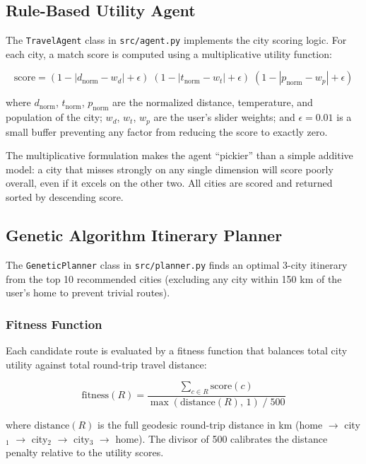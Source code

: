 \documentclass[12pt]{article}
\begin{document}
\subsection{Rule-Based Utility Agent}
The \texttt{TravelAgent} class in \texttt{src/agent.py} implements the city scoring logic. For each city, a match score is computed using a multiplicative utility function:

\begin{equation}
    \text{score} = (1 - |d_{\text{norm}} - w_d| + \epsilon)\;
                   (1 - |t_{\text{norm}} - w_t| + \epsilon)\;
                   (1 - |p_{\text{norm}} - w_p| + \epsilon)
\end{equation}

where $d_{\text{norm}}$, $t_{\text{norm}}$, $p_{\text{norm}}$ are the normalized distance, temperature, and population of the city; $w_d$, $w_t$, $w_p$ are the user's slider weights; and $\epsilon = 0.01$ is a small buffer preventing any factor from reducing the score to exactly zero.

The multiplicative formulation makes the agent ``pickier'' than a simple additive model: a city that misses strongly on any single dimension will score poorly overall, even if it excels on the other two. All cities are scored and returned sorted by descending score.

\subsection{Genetic Algorithm Itinerary Planner}
The \texttt{GeneticPlanner} class in \texttt{src/planner.py} finds an optimal 3-city itinerary from the top 10 recommended cities (excluding any city within 150 km of the user's home to prevent trivial routes).

\subsubsection{Fitness Function}
Each candidate route is evaluated by a fitness function that balances total city utility against total round-trip travel distance:

\begin{equation}
    \text{fitness}(R) = \frac{\displaystyle\sum_{c \in R} \text{score}(c)}{\max(\text{distance}(R),\, 1) \;/\; 500}
\end{equation}

where $\text{distance}(R)$ is the full geodesic round-trip distance in km (home $\to$ city$_1$ $\to$ city$_2$ $\to$ city$_3$ $\to$ home). The divisor of 500 calibrates the distance penalty relative to the utility scores.
\end{document}
